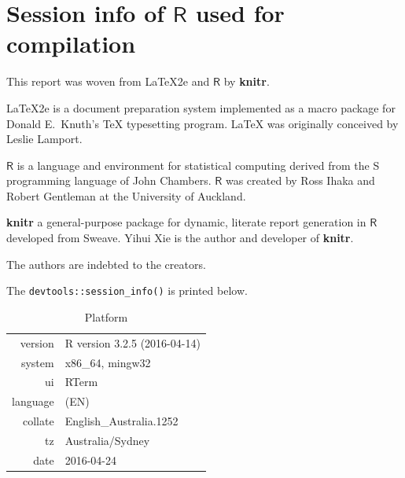\documentclass{grattanAlpha}\usepackage[]{graphicx}\usepackage[]{color}
\begin{document}
\onecolumn
\chapter{Session info of \texorpdfstring{$\mathsf{R}$}{R} used for compilation}
\begin{multicols*}{2}
This report was woven from  \textrm{\LaTeX2e} and $\mathsf{R}$ by \textbf{knitr}. 

\textrm{\LaTeX2e} is a document preparation system implemented as a macro package for Donald E.\ Knuth's \textrm{\TeX} typesetting program. \textrm{\LaTeX} was originally conceived by Leslie Lamport. 

$\mathsf{R}$ is a language and environment for statistical computing derived from the S programming language of John Chambers. $\mathsf{R}$ was created by Ross Ihaka and Robert Gentleman at the University of Auckland. 

\textbf{knitr} a general-purpose package for dynamic, literate report generation in $\mathsf{R}$ developed from Sweave. Yihui Xie is the author and developer of \textbf{knitr}. 

The authors are indebted to the creators.

The \verb=devtools::session_info()= is printed below.
\end{multicols*}


\begin{table}[!htb]
\centering
\caption{Platform}
\begin{tabular}{rl}
  \toprule
 version & R version 3.2.5 (2016-04-14) \\ 
  system & x86\_64, mingw32 \\ 
  ui & RTerm \\ 
  language & (EN) \\ 
  collate & English\_Australia.1252 \\ 
  tz & Australia/Sydney \\ 
  date & 2016-04-24 \\ 
   \bottomrule
\end{tabular}

\end{table}

\end{document}
